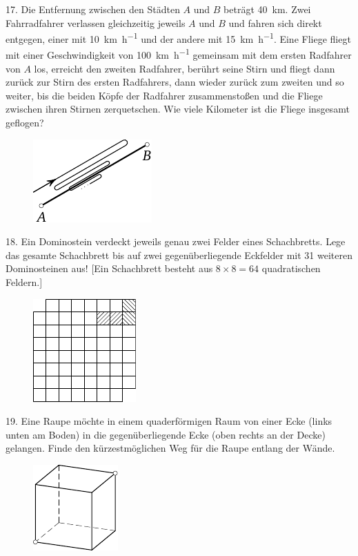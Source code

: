 \begin{problem}{17.}
	Die Entfernung zwischen den Städten $A$ und $B$ beträgt \SI{40}{\km}. Zwei Fahrradfahrer verlassen gleich\-zei\-tig jeweils $A$ und $B$ und fahren sich direkt entgegen, einer mit \SI{10}{\km\per\hour} und der andere mit \SI{15}{\km\per\hour}. Eine Fliege fliegt mit einer Geschwindigkeit von \SI{100}{\km\per\hour} gemeinsam mit dem ersten Radfahrer von $A$ los, er\-reicht den zweiten Radfahrer, berührt seine Stirn und fliegt dann zurück zur Stirn des ersten Radfahrers, dann wieder zurück zum zweiten und so weiter, bis die beiden Köpfe der Radfahrer zusammenstoßen und die Fliege zwischen ihren Stirnen zerquetschen.
	Wie viele Kilometer ist die Fliege insgesamt geflogen?
	\begin{figure}
		\includegraphics{resources/taskbook-1}
	\end{figure}
\end{problem}

\begin{problem}{18.}
	Ein Dominostein verdeckt jeweils genau zwei Felder eines Schachbretts. Lege das gesamte Schachbrett bis auf zwei gegenüberliegende Eckfelder mit 31 weiteren Dominosteinen aus! [Ein Schachbrett besteht aus $8 \times 8 = 64$ quadratischen Feldern.]
	\begin{figure}
		\includegraphics{resources/taskbook-2}
	\end{figure}
\end{problem}

\begin{problem}{19.}
	Eine Raupe möchte in einem quaderförmigen Raum von einer Ecke (links unten am Boden) in die gegenüberliegende Ecke (oben rechts an der Decke) gelangen.
	Finde den kürzestmöglichen Weg für die Raupe entlang der Wände.
	\begin{figure}
		\includegraphics{resources/taskbook-3}
	\end{figure}
\end{problem}


